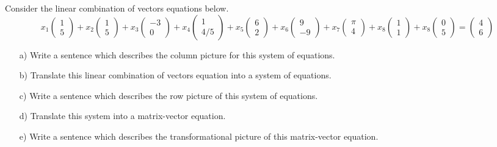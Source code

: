 \documentclass[cahier-main.tex]{subfiles}
\begin{document}
\begin{task}
Consider the linear combination of vectors equations below.
\[
x_1 \begin{pmatrix} 1 \\5 \end{pmatrix} + x_2 \begin{pmatrix} 1\\5 \end{pmatrix} +
x_3 \begin{pmatrix} -3\\0 \end{pmatrix} + x_4 \begin{pmatrix} 1\\ 4/5 \end{pmatrix} +
x_5 \begin{pmatrix} 6\\2 \end{pmatrix} + x_6 \begin{pmatrix} 9\\-9 \end{pmatrix} +
x_7 \begin{pmatrix} \pi \\ 4 \end{pmatrix} + x_8 \begin{pmatrix} 1\\1 \end{pmatrix} +
x_8 \begin{pmatrix} 0\\5 \end{pmatrix} = \begin{pmatrix} 4\\6 \end{pmatrix} 
\]
\begin{itemize}
\item[a)] Write a sentence which describes the column picture for this system of equations.

\item[b)] Translate this linear combination of vectors equation into a system of equations. 
\item[c)] Write a sentence which describes the row picture of this system of equations.
\item[d)] Translate this system into a matrix-vector equation.
\item[e)] Write a sentence which describes the transformational picture of this matrix-vector equation.\end{itemize}
\end{task}
\end{document}
